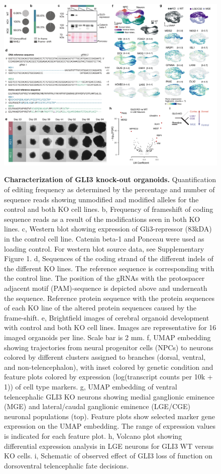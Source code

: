 \begin{figure}[h!]
    \centering
	\includegraphics[width=\textwidth]{figures/pando/Figure_S9}
    \label{fig:regS9}
    \caption{\textbf{Characterization of GLI3 knock-out organoids.} Quantification of editing frequency as determined by the percentage and number of sequence reads showing unmodified and modified alleles for the control and both KO cell lines. b, Frequency of frameshift of coding sequence reads as a result of the modifications seen in both KO lines. c, Western blot showing expression of Gli3-repressor (83kDA) in the control cell line. Catenin beta-1 and Ponceau were used as loading control. For western blot source data, see Supplementary Figure 1. d, Sequences of the coding strand of the different indels of the different KO lines. The reference sequence is corresponding with the control line. The position of the gRNAs with the protospacer adjacent motif (PAM)-sequence is depicted above and underneath the sequence. Reference protein sequence with the protein sequences of each KO line of the altered protein sequences caused by the frame-shift. e, Brightfield images of cerebral organoid development with control and both KO cell lines. Images are representative for 16 imaged organoids per line. Scale bar is 2 mm. f, UMAP embedding showing trajectories from neural progenitor cells (NPCs) to neurons colored by different clusters assigned to branches (dorsal, ventral, and non-telencephalon), with inset colored by genetic condition and feature plots colored by expression (log(transcript counts per 10k + 1)) of cell type markers. g, UMAP embedding of ventral telencephalic GLI3 KO neurons showing medial ganglionic eminence (MGE) and lateral/caudal ganglionic eminence (LGE/CGE) neuronal populations (top). Feature plots show selected marker gene expression on the UMAP embedding. The range of expression values is indicated for each feature plot. h, Volcano plot showing differential expression analysis in LGE neurons for GLI3 WT versus KO cells. i, Schematic of observed effect of GLI3 loss of function on dorsoventral telencephalic fate decisions. }
\end{figure}


